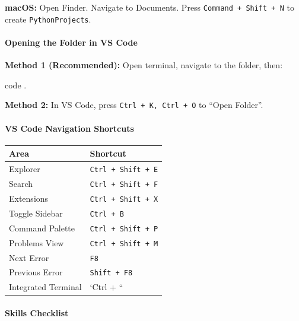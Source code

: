\documentclass[
  justified,
  openright,
]{tufte-book}
\let\subsection\paragraph
\let\paragraph\paragraph
\newenvironment{Shaded}{%
  \begin{mdframed}[style=TufteCode]%
}{%
  \end{mdframed}%
}
\let\subsection\paragraph
\let\paragraph\paragraph
\begin{document}
\textbf{macOS:} Open Finder. Navigate to Documents. Press
\texttt{Command\ +\ Shift\ +\ N} to create \texttt{PythonProjects}.

\subsection{Opening the Folder in VS
Code}\label{opening-the-folder-in-vs-code}

\textbf{Method 1 (Recommended):} Open terminal, navigate to the folder,
then:

\begin{Shaded}
\begin{Highlighting}[]
code .
\end{Highlighting}
\end{Shaded}

\textbf{Method 2:} In VS Code, press \texttt{Ctrl\ +\ K,\ Ctrl\ +\ O} to
``Open Folder''.

\subsection{VS Code Navigation
Shortcuts}\label{vs-code-navigation-shortcuts}

\begin{fullwidth}{\def\LTcaptype{none} %
\begin{longtable}[]{@{}ll@{}}
\toprule\noalign{}
Area & Shortcut \\
\midrule\noalign{}
\endhead
\bottomrule\noalign{}
\endlastfoot
Explorer & \texttt{Ctrl\ +\ Shift\ +\ E} \\
Search & \texttt{Ctrl\ +\ Shift\ +\ F} \\
Extensions & \texttt{Ctrl\ +\ Shift\ +\ X} \\
Toggle Sidebar & \texttt{Ctrl\ +\ B} \\
Command Palette & \texttt{Ctrl\ +\ Shift\ +\ P} \\
Problems View & \texttt{Ctrl\ +\ Shift\ +\ M} \\
Next Error & \texttt{F8} \\
Previous Error & \texttt{Shift\ +\ F8} \\
Integrated Terminal & `Ctrl + `` \\
\end{longtable}
}
\end{fullwidth}

\subsection{Skills Checklist}\label{skills-checklist-2}
\end{document}
